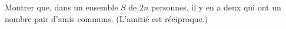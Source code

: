 Montrer que, dans un ensemble $S$ de $2n$ personnes, il y en a deux qui ont un nombre pair d'amis communs. (L'amitié est réciproque.)
